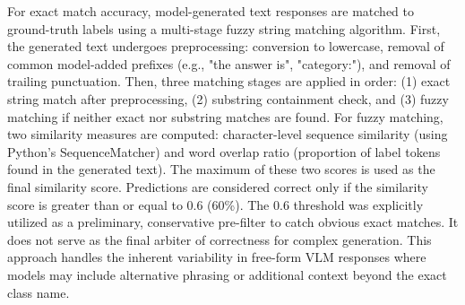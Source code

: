 \documentclass[10pt,letterpaper]{article}
\begin{document}
For exact match accuracy, model-generated text responses are matched to ground-truth labels using a multi-stage fuzzy string matching algorithm. First, the generated text undergoes preprocessing: conversion to lowercase, removal of common model-added prefixes (e.g., "the answer is", "category:"), and removal of trailing punctuation. Then, three matching stages are applied in order: (1) exact string match after preprocessing, (2) substring containment check, and (3) fuzzy matching if neither exact nor substring matches are found. For fuzzy matching, two similarity measures are computed: character-level sequence similarity (using Python's SequenceMatcher) and word overlap ratio (proportion of label tokens found in the generated text). The maximum of these two scores is used as the final similarity score. Predictions are considered correct only if the similarity score is greater than or equal to 0.6 (60\%). The 0.6 threshold was explicitly utilized as a preliminary, conservative pre-filter to catch obvious exact matches. It does not serve as the final arbiter of correctness for complex generation. This approach handles the inherent variability in free-form VLM responses where models may include alternative phrasing or additional context beyond the exact class name.
\end{document}
